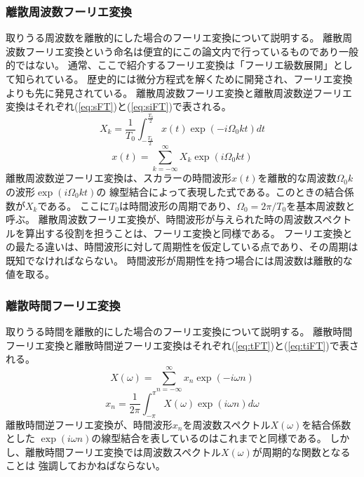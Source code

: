 \subsubsection{離散周波数フーリエ変換}
取りうる周波数を離散的にした場合のフーリエ変換について説明する。
離散周波数フーリエ変換という命名は便宜的にこの論文内で行っているものであり一般的ではない。
通常、ここで紹介するフーリエ変換は「フーリエ級数展開」として知られている。
歴史的には微分方程式を解くために開発され、フーリエ変換よりも先に発見されている。
離散周波数フーリエ変換と離散周波数逆フーリエ変換はそれぞれ(\ref{eq:sFT})と(\ref{eq:siFT})で表される。
\begin{equation}
    X_k=\frac{1}{T_0}\int_{-\frac{T_0}{2}}^{\frac{T_0}{2}} x(t)\exp(-i\Omega_0 kt)dt
    \label{eq:sFT}
\end{equation}
\begin{equation}
    x(t)=\sum_{k=-\infty}^{\infty} X_k \exp(i\Omega_0 k t)
    \label{eq:siFT}
\end{equation}
離散周波数逆フーリエ変換は、スカラーの時間波形\(x(t)\)を離散的な周波数\(\Omega_0 k\)の波形\(\exp(i\Omega_0 k t)\)の
線型結合によって表現した式である。このときの結合係数が\(X_k\)である。
ここに\(T_0\)は時間波形の周期であり、\(\Omega_0 = 2\pi/T_0\)を基本周波数と呼ぶ。
離散周波数フーリエ変換が、時間波形が与えられた時の周波数スペクトルを算出する役割を担うことは、フーリエ変換と同様である。
フーリエ変換との最たる違いは、時間波形に対して周期性を仮定している点であり、その周期は既知でなければならない。
時間波形が周期性を持つ場合には周波数は離散的な値を取る。

\subsubsection{離散時間フーリエ変換}
取りうる時間を離散的にした場合のフーリエ変換について説明する。
離散時間フーリエ変換と離散時間逆フーリエ変換はそれぞれ(\ref{eq:tFT})と(\ref{eq:tiFT})で表される。
\begin{equation}
    X(\omega)=\sum_{n = -\infty}^{\infty} x_n \exp(-i\omega n)
    \label{eq:tFT}
\end{equation}
\begin{equation}
    x_n=\frac{1}{2\pi} \int_{-\pi}^{\pi} X(\omega) \exp(i\omega n)d\omega
    \label{eq:tiFT}
\end{equation}
離散時間逆フーリエ変換が、時間波形\(x_n\)を周波数スペクトル\(X(\omega)\)を結合係数とした
\(\exp(i\omega n)\)の線型結合を表しているのはこれまでと同様である。
しかし、離散時間フーリエ変換では周波数スペクトル\(X(\omega)\)が周期的な関数となることは
強調しておかねばならない。

